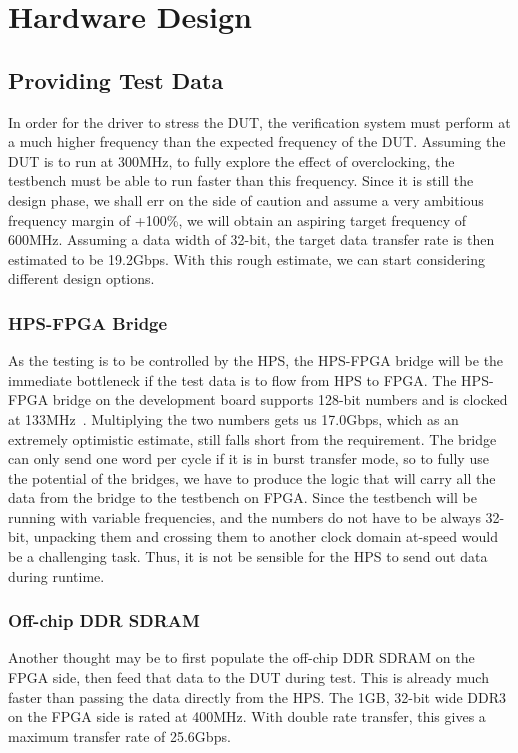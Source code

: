 \chapter{Hardware Design}

\section{Providing Test Data}
In order for the driver to stress the DUT, the verification system must perform at a much higher frequency than the expected frequency of the DUT.
Assuming the DUT is to run at 300MHz, to fully explore the effect of overclocking, the testbench must be able to run faster than this frequency.
Since it is still the design phase, we shall err on the side of caution and assume a very ambitious frequency margin of +100\%, we will obtain an aspiring target frequency of 600MHz.
Assuming a data width of 32-bit, the target data transfer rate is then estimated to be 19.2Gbps.
With this rough estimate, we can start considering different design options.

\subsection{HPS-FPGA Bridge}
As the testing is to be controlled by the HPS, the HPS-FPGA bridge will be the immediate bottleneck if the test data is to flow from HPS to FPGA.
The HPS-FPGA bridge on the development board supports 128-bit numbers and is clocked at 133MHz~\cite{Altera6}.
Multiplying the two numbers gets us 17.0Gbps, which as an extremely optimistic estimate, still falls short from the requirement.
The bridge can only send one word per cycle if it is in burst transfer mode, so to fully use the potential of the bridges, we have to produce the logic that will carry all the data from the bridge to the testbench on FPGA.
Since the testbench will be running with variable frequencies, and the numbers do not have to be always 32-bit, unpacking them and crossing them to another clock domain at-speed would be a challenging task.
Thus, it is not be sensible for the HPS to send out data during runtime.

\subsection{Off-chip DDR SDRAM}
Another thought may be to first populate the off-chip DDR SDRAM on the FPGA side, then feed that data to the DUT during test.
This is already much faster than passing the data directly from the HPS.
The 1GB, 32-bit wide DDR3 on the FPGA side is rated at 400MHz.
With double rate transfer, this gives a maximum transfer rate of 25.6Gbps.

